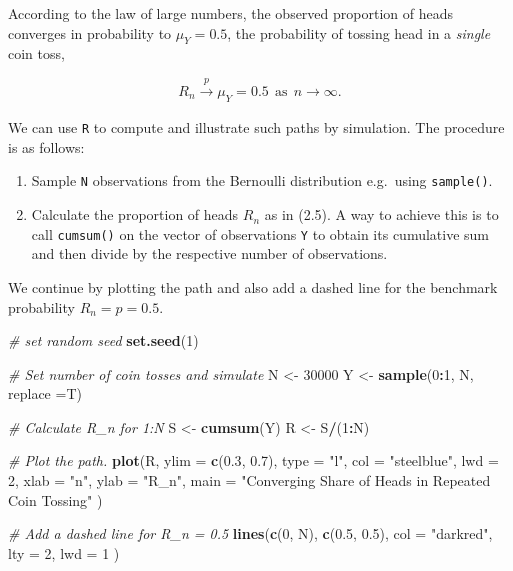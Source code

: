 \documentclass[]{book}
\newenvironment{Shaded}{\begin{snugshade}}{\end{snugshade}}
\newcommand{\KeywordTok}[1]{\textcolor[rgb]{0.13,0.29,0.53}{\textbf{#1}}}
\newcommand{\DataTypeTok}[1]{\textcolor[rgb]{0.13,0.29,0.53}{#1}}
\newcommand{\DecValTok}[1]{\textcolor[rgb]{0.00,0.00,0.81}{#1}}
\newcommand{\FloatTok}[1]{\textcolor[rgb]{0.00,0.00,0.81}{#1}}
\newcommand{\StringTok}[1]{\textcolor[rgb]{0.31,0.60,0.02}{#1}}
\newcommand{\CommentTok}[1]{\textcolor[rgb]{0.56,0.35,0.01}{\textit{#1}}}
\newcommand{\OperatorTok}[1]{\textcolor[rgb]{0.81,0.36,0.00}{\textbf{#1}}}
\newcommand{\NormalTok}[1]{#1}
\providecommand{\tightlist}{%
  \setlength{\itemsep}{0pt}\setlength{\parskip}{0pt}}
\theoremstyle{definition}
\theoremstyle{definition}
\theoremstyle{definition}
\theoremstyle{remark}
\begin{document}
According to the law of large numbers, the observed proportion of heads
converges in probability to \(\mu_Y = 0.5\), the probability of tossing
head in a \emph{single} coin toss,

\[ R_n \xrightarrow[]{p} \mu_Y=0.5 \ \ \text{as} \ \ n \rightarrow \infty.  \]

We can use \texttt{R} to compute and illustrate such paths by
simulation. The procedure is as follows:

\begin{enumerate}
\def\labelenumi{\arabic{enumi}.}
\tightlist
\item
  Sample \texttt{N} observations from the Bernoulli distribution
  e.g.~using \texttt{sample()}.
\item
  Calculate the proportion of heads \(R_n\) as in (2.5). A way to
  achieve this is to call \texttt{cumsum()} on the vector of
  observations \texttt{Y} to obtain its cumulative sum and then divide
  by the respective number of observations.
\end{enumerate}

We continue by plotting the path and also add a dashed line for the
benchmark probability \(R_n = p = 0.5\).

\begin{Shaded}
\begin{Highlighting}[]
\CommentTok{# set random seed}
\KeywordTok{set.seed}\NormalTok{(}\DecValTok{1}\NormalTok{)}

\CommentTok{# Set number of coin tosses and simulate}
\NormalTok{N <-}\StringTok{ }\DecValTok{30000}
\NormalTok{Y <-}\StringTok{ }\KeywordTok{sample}\NormalTok{(}\DecValTok{0}\OperatorTok{:}\DecValTok{1}\NormalTok{, N, }\DataTypeTok{replace =}\NormalTok{T)}

\CommentTok{# Calculate R_n for 1:N}
\NormalTok{S <-}\StringTok{ }\KeywordTok{cumsum}\NormalTok{(Y)}
\NormalTok{R <-}\StringTok{ }\NormalTok{S}\OperatorTok{/}\NormalTok{(}\DecValTok{1}\OperatorTok{:}\NormalTok{N)}

\CommentTok{# Plot the path.}
\KeywordTok{plot}\NormalTok{(R, }
     \DataTypeTok{ylim =} \KeywordTok{c}\NormalTok{(}\FloatTok{0.3}\NormalTok{, }\FloatTok{0.7}\NormalTok{), }
     \DataTypeTok{type =} \StringTok{"l"}\NormalTok{, }
     \DataTypeTok{col =} \StringTok{"steelblue"}\NormalTok{, }
     \DataTypeTok{lwd =} \DecValTok{2}\NormalTok{, }
     \DataTypeTok{xlab =} \StringTok{"n"}\NormalTok{, }
     \DataTypeTok{ylab =} \StringTok{"R_n"}\NormalTok{,}
     \DataTypeTok{main =} \StringTok{"Converging Share of Heads in Repeated Coin Tossing"}
\NormalTok{     )}

\CommentTok{# Add a dashed line for R_n = 0.5}
\KeywordTok{lines}\NormalTok{(}\KeywordTok{c}\NormalTok{(}\DecValTok{0}\NormalTok{, N), }
      \KeywordTok{c}\NormalTok{(}\FloatTok{0.5}\NormalTok{, }\FloatTok{0.5}\NormalTok{), }
      \DataTypeTok{col =} \StringTok{"darkred"}\NormalTok{, }
      \DataTypeTok{lty =} \DecValTok{2}\NormalTok{, }
      \DataTypeTok{lwd =} \DecValTok{1}
\NormalTok{      )}
\end{Highlighting}
\end{Shaded}
\end{document}
